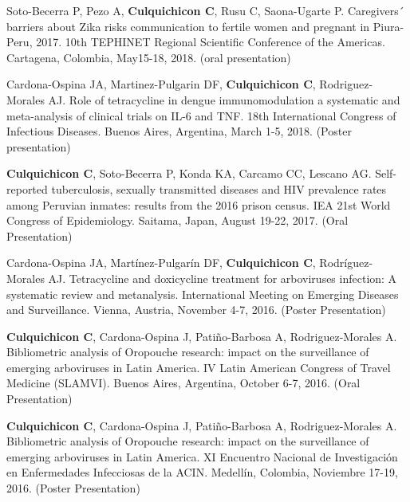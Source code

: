 \documentclass[10pt]{article}
\begin{document}
\begin{etaremune}
	\item Soto-Becerra P, Pezo A, {\bf Culquichicon C}, Rusu C, Saona-Ugarte P. Caregivers´ barriers about Zika risks communication to fertile women and pregnant in Piura-Peru, 2017. 10th TEPHINET Regional Scientific Conference of the Americas. Cartagena, Colombia, May15-18, 2018. (oral presentation) \\
	\vspace{-0.23in}
	
	\item Cardona-Ospina JA, Martinez-Pulgarin DF, {\bf Culquichicon C}, Rodriguez-Morales AJ. Role of tetracycline in dengue immunomodulation a systematic and meta-analysis of clinical trials on IL-6 and TNF. 18th International Congress of Infectious Diseases. Buenos Aires, Argentina, March 1-5, 2018. (Poster presentation) \\
	\vspace{-0.23in}
	
	\item {\bf Culquichicon C}, Soto-Becerra P, Konda KA, Carcamo CC, Lescano AG. Self-reported tuberculosis, sexually transmitted diseases and HIV prevalence rates among Peruvian inmates: results from the 2016 prison census. IEA 21st World Congress of Epidemiology. Saitama, Japan, August 19-22, 2017. (Oral Presentation) \\
	\vspace{-0.23in}
	
	\item Cardona-Ospina JA, Martínez-Pulgarín DF, {\bf Culquichicon C}, Rodríguez-Morales AJ. Tetracycline and doxicycline treatment for arboviruses infection: A systematic review and metanalysis. International Meeting on Emerging Diseases and Surveillance. Vienna, Austria, November 4-7, 2016. (Poster Presentation) \\
	\vspace{-0.23in}
	
	\item {\bf Culquichicon C}, Cardona-Ospina J, Patiño-Barbosa A, Rodriguez-Morales A. Bibliometric analysis of Oropouche research: impact on the surveillance of emerging arboviruses in Latin America. IV Latin American Congress of Travel Medicine (SLAMVI). Buenos Aires, Argentina, October 6-7, 2016. (Oral Presentation) \\
	\vspace{-0.23in}
	
	\item {\bf Culquichicon C}, Cardona-Ospina J, Patiño-Barbosa A, Rodriguez-Morales A. Bibliometric analysis of Oropouche research: impact on the surveillance of emerging arboviruses in Latin America. XI Encuentro Nacional de Investigación en Enfermedades Infecciosas de la ACIN. Medellín, Colombia, Noviembre 17-19, 2016. (Poster Presentation)	
	
	
\end{etaremune}
\end{document}
